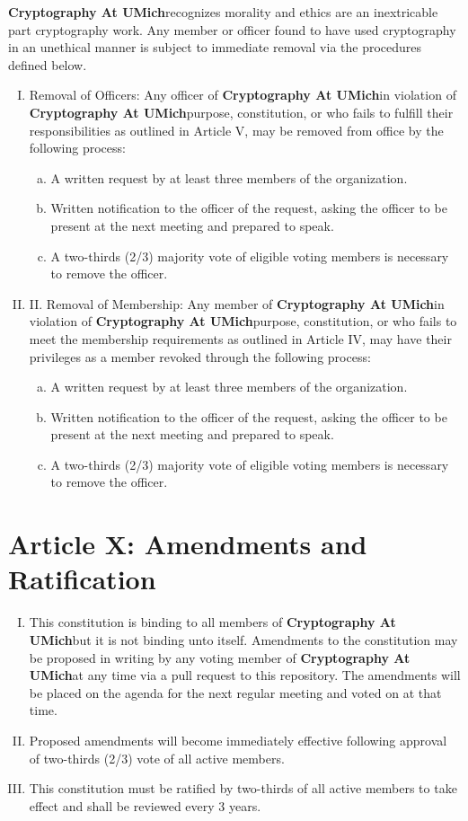 \documentclass[11pt]{article}
\newcommand{\orgname}{\textbf{Cryptography At UMich}}
\begin{document}
    \orgname recognizes morality and ethics are an inextricable part cryptography work.
    Any member or officer found to have used cryptography in an unethical manner is subject to immediate removal via the procedures defined below.

    \begin{enumerate}[I.]
        \item Removal of Officers: Any officer of \orgname in violation of \orgname purpose, constitution, or who fails to fulfill their responsibilities as outlined in Article V, may be removed from office by the following process:
        \begin{enumerate}[a.]
            \item A written request by at least three members of the organization.
            \item Written notification to the officer of the request, asking the officer to be present at the next meeting and prepared to speak.
            \item A two-thirds (2/3) majority vote of eligible voting members is necessary to remove the officer.
        \end{enumerate}
        \item II. Removal of Membership: Any member of \orgname in violation of \orgname purpose, constitution, or who fails to meet the membership requirements as outlined in Article IV, may have their privileges as a member revoked through the following process:
        \begin{enumerate}[a.]
            \item A written request by at least three members of the organization.
            \item Written notification to the officer of the request, asking the officer to be present at the next meeting and prepared to speak.
            \item A two-thirds (2/3) majority vote of eligible voting members is necessary to remove the officer.
        \end{enumerate}
    \end{enumerate}


    \section{Article X: Amendments and Ratification}
    \begin{enumerate}[I.]
        \item This constitution is binding to all members of \orgname but it is not binding unto itself.
        Amendments to the constitution may be proposed in writing by any voting member of \orgname at any time via a pull request to this repository.
        The amendments will be placed on the agenda for the next regular meeting and voted on at that time.
        \item Proposed amendments will become immediately effective following approval of two-thirds (2/3) vote of all active members.
        \item This constitution must be ratified by two-thirds of all active members to take effect and shall be reviewed every 3 years.
    \end{enumerate}
\end{document}
